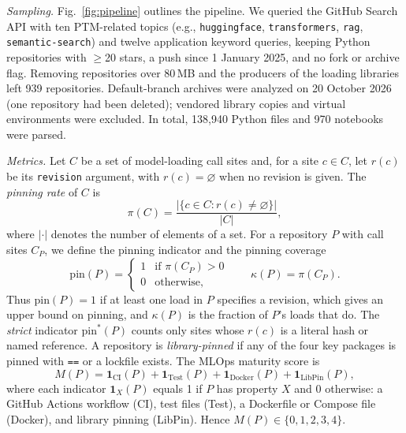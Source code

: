\documentclass[conference]{IEEEtran}
\begin{document}
\textit{Sampling.} Fig.~\ref{fig:pipeline} outlines the pipeline. We queried the GitHub Search API with ten PTM-related topics (e.g., \texttt{huggingface}, \texttt{transformers}, \texttt{rag}, \texttt{semantic-search}) and twelve application keyword queries, keeping Python repositories with $\geq$20 stars, a push since 1 January 2025, and no fork or archive flag. Removing repositories over 80\,MB and the producers of the loading libraries left 939 repositories. Default-branch archives were analyzed on 20 October 2026 (one repository had been deleted); vendored library copies and virtual environments were excluded. In total, 138,940 Python files and 970 notebooks were parsed.

\textit{Metrics.} Let $C$ be a set of model-loading call sites and, for a site $c \in C$, let $r(c)$ be its \texttt{revision} argument, with $r(c)=\varnothing$ when no revision is given. The \emph{pinning rate} of $C$ is
\begin{equation}
\pi(C) = \frac{|\{c \in C : r(c) \neq \varnothing\}|}{|C|},
\label{eq:pi}
\end{equation}
where $|\cdot|$ denotes the number of elements of a set. For a repository $P$ with call sites $C_P$, we define the pinning indicator and the pinning coverage
\begin{equation}
\mathrm{pin}(P) = \begin{cases} 1 & \text{if } \pi(C_P) > 0\\ 0 & \text{otherwise,}\end{cases} \qquad \kappa(P) = \pi(C_P).
\label{eq:pin}
\end{equation}
Thus $\mathrm{pin}(P)=1$ if at least one load in $P$ specifies a revision, which gives an upper bound on pinning, and $\kappa(P)$ is the fraction of $P$'s loads that do. The \emph{strict} indicator $\mathrm{pin}^{*}(P)$ counts only sites whose $r(c)$ is a literal hash or named reference. A repository is \emph{library-pinned} if any of the four key packages is pinned with \texttt{==} or a lockfile exists. The MLOps maturity score is
\begin{equation}
M(P) = \mathbf{1}_{\mathrm{CI}}(P) + \mathbf{1}_{\mathrm{Test}}(P) + \mathbf{1}_{\mathrm{Docker}}(P) + \mathbf{1}_{\mathrm{LibPin}}(P),
\label{eq:m}
\end{equation}
where each indicator $\mathbf{1}_X(P)$ equals 1 if $P$ has property $X$ and 0 otherwise: a GitHub Actions workflow (CI), test files (Test), a Dockerfile or Compose file (Docker), and library pinning (LibPin). Hence $M(P) \in \{0,1,2,3,4\}$.
\end{document}
